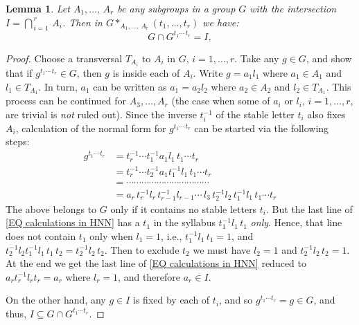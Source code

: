 \documentclass[12pt, a4paper]{amsart}
\newcommand{\1}{\{1\}}
\theoremstyle{plain}
\newtheorem{Lemma}[Theorem]{Lemma}
\theoremstyle{definition}
\theoremstyle{remark}
\numberwithin{equation}{section}
\begin{document}
\begin{Lemma}
\label{LE intersection in HNN extension multi-dimensional}
Let $A_1,\ldots,\,A_r$ be any subgroups in a group $G$ with the intersection 
$I=\bigcap_{\,i=1}^{\,r} \,A_i$. 
Then in $G *_{A_1,\ldots,\,A_r} (t_1,\ldots,t_r)$ we have:
\begin{equation}
\label{EQ gemeral intersection in HNN}
\textstyle
G \cap G^{t_1 \cdots\, t_r}
= I,
\end{equation}
\end{Lemma}

\begin{proof}
Choose a transversal $T_{A_i}$ to $A_i$ in $G$, $i=1,\ldots,r$.
%
Take any $g\in G$, and show that if $g^{t_1 \cdots\, t_r}\in G$, then $g$ is inside each of $A_i$.
%
Write $g=a_1 l_1$ where $a_1\in A_1$ and $l_1 \in T_{A_1}$. In turn, $a_1$ can be written as $a_1=a_2 l_2$ where $a_2\in A_2$ and $l_2 \in T_{A_1}$. This process can be continued for $A_3,\ldots, A_r$ (the case when some of $a_i$ or $l_i$, $i=1,\ldots,r$, are trivial is \textit{not} ruled out).
%
Since the inverse $t_i^{-1}$ of the stable letter $t_i$ also fixes $A_i$, calculation of the normal form for $g^{t_1 \cdots\, t_r}$ can be started via the following steps:
\begin{equation}
\label{EQ calculations in HNN}
\begin{aligned}
g^{t_1 \cdots\, t_r}
&=t_r^{-1}\cdots t_1^{-1} a_1 l_1 \, t_1\cdots t_r \\
& =t_r^{-1}\cdots t_2^{-1} a_1 t_1^{-1} l_1 \, t_1\cdots t_r 
\\
& =  \cdots \cdots \cdots \cdots \cdots \cdots \cdots \cdots \cdots \cdots \cdots   \\
& =  a_{r}\, t_{r}^{-1}  l_{r}\, t_{r-1}^{-1} l_{r-1} \cdots \,l_3\,t_2^{-1} l_2\, t_1^{-1} l_1 \, t_1\cdots t_r 
\end{aligned}
\end{equation}
%
The above belongs to $G$ only if it contains no stable letters $t_i$.
But the last line of \eqref{EQ calculations in HNN} has a $t_1$  in the syllabus $ t_1^{-1} l_1 \, t_1$ \textit{only}. Hence, that line does not contain $t_1$ only when $l_1=1$, i.e., $t_1^{-1} l_1 \, t_1=1$, and
$t_2^{-1} l_2 t_1^{-1} l_1 \, t_1\, t_2=t_2^{-1} l_2 \, t_2$.
Then to exclude $t_2$ we must have $l_2=1$ and $t_2^{-1} l_2 \, t_2=1$. 
At the end we get the last line of \eqref{EQ calculations in HNN} reduced to 
$a_{r} t_{r}^{-1} l_{r} t_{r}=a_{r}$ where $l_{r}=1$, and therefore $a_{r} \in I$.

On the other hand, any  $g \in I$ is fixed by each of $t_i$, and so $g^{t_1 \cdots t_r}=g\in G$, and thus, 
 $I \subseteq G \cap G^{t_1 \cdots t_r}$.
\end{proof}
\end{document}
